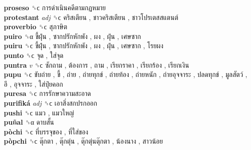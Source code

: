 \textbf{proseso} ␝ϲ   การดำเนินคดีตามกฏหมาย   \\
\textbf{protestant} \emph{adj}  ␝ϲ   คริสเตียน ,  ชาวคริสเตียน ,  ชาวโปรเตสสแตนต์   \\
\textbf{proverbio} ␝ϲ   สุภาษิต   \\
\textbf{puiro} ␝α   ขี้ฝุ่น ,  ซากปรักหักพัง ,  ผง ,  ฝุ่น ,  เศษซาก   \\
\textbf{puiru} ␝ϲ   ขี้ฝุ่น ,  ซากปรักหักพัง ,  ผง ,  ฝุ่น ,  เศษซาก ,  โรยผง   \\
\textbf{punto} ␝ϲ   จุด ,  ใส่จุด   \\
\textbf{puntra} \emph{v}  ␝ϲ   ซักถาม ,  ต้องการ ,  ถาม ,  เรียกราคา ,  เรียกร้อง ,  เรียกเงิน   \\
\textbf{pupu} ␝ϲ   ขับถ่าย ,  ขี้ ,  ถ่าย ,  ถ่ายทุกข์ ,  ถ่ายท้อง ,  ถ่ายหนัก ,  ถ่ายอุจจาระ ,  ปลดทุกข์ ,  มูลสัตว์ ,  อึ ,  อุจจาระ ,  ใส่ปุ๋ยคอก   \\
\textbf{puresa} ␝ϲ   การรักษาความสะอาด   \\
\textbf{purifiká} \emph{adj}  ␝ϲ   เอาสิ่งสกปรกออก   \\
\textbf{pushi} ␝ϲ   แมว ,  แมวใหญ่   \\
\textbf{puñal} ␝α   ดาบสั้น   \\
\textbf{pòchi} ␝ϲ   ที่บรรจุของ ,  ที่ใส่ของ   \\
\textbf{pòpchi} ␝ϲ   ตุ๊กตา ,  ตุ๊กตุ่น ,  ตุ๊กตุ่นตุ๊กตา ,  น้องนาง ,  สาวน้อย   \\
